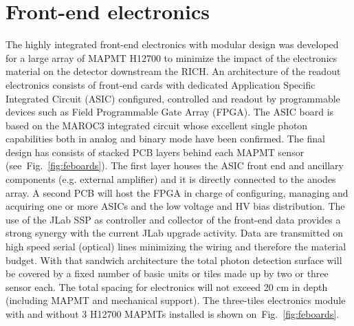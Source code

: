\section{Front-end electronics$^{}$}

The highly integrated front-end electronics with modular design was developed for a large array of MAPMT H12700 to minimize the impact of the electronics material on the detector downstream the RICH.
An architecture of the readout electronics consists of front-end cards with dedicated Application Specific Integrated Circuit (ASIC) configured, controlled and readout by programmable devices such as Field Programmable Gate Array (FPGA).
The ASIC board is based on the MAROC3 integrated circuit whose excellent single photon capabilities both in analog and binary mode have been confirmed.
The final design has consists of stacked PCB layers behind each MAPMT sensor (see~Fig.~\ref{fig:feboards}).
The first layer houses the ASIC front end and ancillary components (e.g. external amplifier) and it is directly connected to the anodes array.
A second PCB will host the FPGA in charge of configuring, managing and acquiring one or more ASICs and the low voltage and HV bias distribution.
The use of the JLab SSP as controller and collector of the front-end data provides a strong synergy with the current JLab upgrade activity.
Data are transmitted on high speed serial (optical) lines minimizing the wiring and therefore the material budget.
With that sandwich architecture the total photon detection surface will be covered by a fixed number of basic units or tiles made up by two or three sensor each.
The total spacing for electronics will not exceed 20 cm in depth (including MAPMT and mechanical support).
The three-tiles electronics module with and without 3 H12700 MAPMTs installed is shown on~Fig.~\ref{fig:feboards}.

